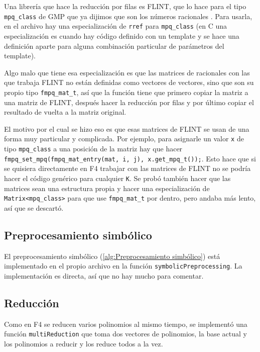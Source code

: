 \documentclass[12pt]{report}
\theoremstyle{customstyle}
\theoremstyle{factstyle}
\newcommand\cpp{C\nolinebreak[4]\hspace{-.05em}\raisebox{.4ex}{\relsize{-3}{\textbf{++}}}\xspace}
\begin{document}
Una librería que hace la reducción por filas es FLINT, que lo hace para el tipo \texttt{mpq\_class} de GMP que ya dijimos que son los números racionales \cite{lib:flint, lib:gmp}. Para usarla, en el archivo  hay una especialización de \texttt{rref} para \texttt{mpq\_class} (en \cpp una especialización es cuando hay código definido con un template y se hace una definición aparte para alguna combinación particular de parámetros del template).

Algo malo que tiene esa especialización es que las matrices de racionales con las que trabaja FLINT no están definidas como vectores de vectores, sino que son su propio tipo \texttt{fmpq\_mat\_t}, así que la función tiene que primero copiar la matriz a una matriz de FLINT, después hacer la reducción por filas y por último copiar el resultado de vuelta a la matriz original.

El motivo por el cual se hizo eso es que esas matrices de FLINT se usan de una forma muy particular y complicada. Por ejemplo, para asignarle un valor \texttt{x} de tipo \texttt{mpq\_class} a una posición de la matriz hay que hacer \texttt{fmpq\_set\_mpq(fmpq\_mat\_entry(mat, i, j), x.get\_mpq\_t(\allowbreak));}. Esto hace que si se quisiera directamente en F4 trabajar con las matrices de FLINT no se podría hacer el código genérico para cualquier \texttt{K}. Se probó también hacer que las matrices sean una estructura propia y hacer una especialización de \texttt{Matrix<mpq\_class>} para que use \texttt{fmpq\_mat\_t} por dentro, pero andaba más lento, así que se descartó. %

\subsection{Preprocesamiento simbólico}

El preprocesamiento simbólico (\cref{alg:Preprocesamiento simbólico}) está implementado en el propio archivo  en la función \texttt{symbolicPreprocessing}. La implementación es directa, así que no hay mucho para comentar.

\subsection{Reducción}

Como en F4 se reducen varios polinomios al mismo tiempo, se implementó una función \texttt{multiReduction} que toma dos vectores de polinomios, la base actual y los polinomios a reducir y los reduce todos a la vez.
\end{document}
